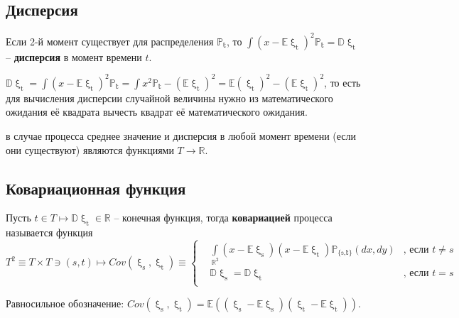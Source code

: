 \subsection{Дисперсия}

\cite{ShamarovDRP11} Если 2-й момент существует для распределения $\mathds{P_\text{t}}$, то $\int (x - \mathds{E}\upxi_\text{t})^2 \mathds{P_\text{t}} = \mathds{D}\upxi_\text{t}$ -- \textbf{дисперсия} в момент времени $t$. 

$\mathds{D}\upxi_\text{t} = \int (x - \mathds{E}\upxi_\text{t})^2 \mathds{P_\text{t}} = \int x^2 \mathds{P_\text{t}} - (\mathds{E}\upxi_\text{t})^2 = \mathds{E}({\upxi_\text{t}})^2 - (\mathds{E}\upxi_\text{t})^2$, то есть для вычисления дисперсии случайной величины нужно из математического ожидания её квадрата вычесть квадрат её математического ожидания.

\begin{remark} в случае процесса среднее значение и дисперсия в любой момент времени (если они существуют) являются функциями $T \rightarrow \mathds{R}$. 
\end{remark}
 
\subsection{Ковариационная функция}

\cite{ShamarovDRP11} Пусть $t \in T \longmapsto \mathds{D}\upxi_\text{t} \in \mathds{R}$ -- конечная функция, тогда \textbf{ковариацией} процесса называется функция 
\begin{equation*}
    T^2 \equiv T \times T \ni (s,t) \longmapsto Cov(\upxi_\text{s}, \upxi_\text{t}) \equiv \left\{
    \begin{aligned}
        & \int\limits_{{\mathds{R}}^2}^{} (x - \mathds{E}\upxi_\text{s})(x - \mathds{E}\upxi_\text{t}) \mathds{P_\text{\{s,t\}}} (dx,dy) & \text{, если } t \neq s \\
        & \mathds{D}\upxi_\text{s} = \mathds{D}\upxi_\text{t} & \text{, если } t = s \\
    \end{aligned}
    \right.
\end{equation*}

Равносильное обозначение: $Cov(\upxi_\text{s}, \upxi_\text{t}) = \mathds{E}((\upxi_\text{s} - \mathds{E}\upxi_\text{s})(\upxi_\text{t} - \mathds{E}\upxi_\text{t}))$. 

\vspace{4pt}

